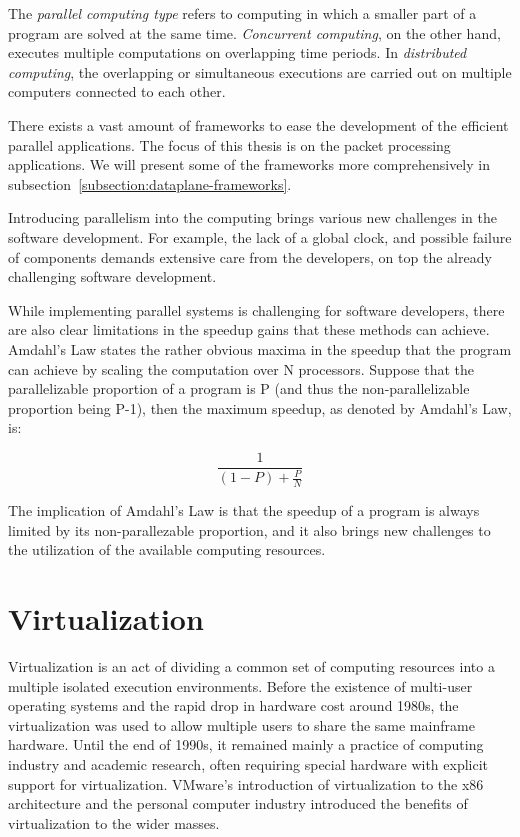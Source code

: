The \emph{parallel computing type} refers to computing in which a smaller part of a program are solved at the same time. \emph{Concurrent computing}, on the other hand, executes multiple computations on overlapping time periods. In \emph{distributed computing}, the overlapping or simultaneous executions are carried out on multiple computers connected to each other.

There exists a vast amount of frameworks to ease the development of the efficient parallel applications. The focus of this thesis is on the packet processing applications. We will present some of the frameworks more comprehensively in subsection~\ref{subsection:dataplane-frameworks}.

Introducing parallelism into the computing brings various new challenges in the software development. For example, the lack of a global clock, and possible failure of components demands extensive care from the developers, on top the already challenging software development.

While implementing parallel systems is challenging for software developers, there are also clear limitations in the speedup gains that these methods can achieve. Amdahl's Law states the rather obvious maxima in the speedup that the program can achieve by scaling the computation over N processors. Suppose that the parallelizable proportion of a program is P (and thus the non-parallelizable proportion being P-1), then the maximum speedup, as denoted by Amdahl's Law, is:~\cite{Amdahl:1967:VSP}

\begin{equation*}
  \frac{1}{(1-P) + \frac{P}{N}}
\end{equation*}

The implication of Amdahl's Law is that the speedup of a program is always limited by its non-parallezable proportion, and it also brings new challenges to the utilization of the available computing resources.

\section{Virtualization}
\label{section:virtualization}
Virtualization is an act of dividing a common set of computing resources into a multiple isolated execution environments. Before the existence of multi-user operating systems and the rapid drop in hardware cost around 1980s, the virtualization was used to allow multiple users to share the same mainframe hardware. Until the end of 1990s, it remained mainly a practice of computing industry and academic research, often requiring special hardware with explicit support for virtualization. VMware's introduction of virtualization to the x86 architecture and the personal computer industry introduced the benefits of virtualization to the wider masses.~\cite{Bugnion:2012:BVX}


